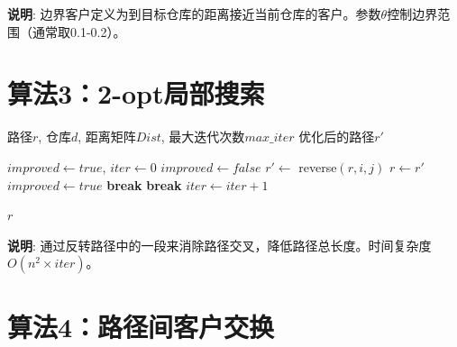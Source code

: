 \documentclass[12pt,a4paper]{article}
\begin{document}
\textbf{说明}: 边界客户定义为到目标仓库的距离接近当前仓库的客户。参数$\theta$控制边界范围（通常取0.1-0.2）。

\newpage

\section{算法3：2-opt局部搜索}

\begin{algorithm}[H]
\caption{2-opt局部搜索（路径内优化）}
\label{alg:2opt}
\begin{algorithmic}[1]
\REQUIRE 路径$r$, 仓库$d$, 距离矩阵$Dist$, 最大迭代次数$max\_iter$
\ENSURE 优化后的路径$r'$

\STATE $improved \gets true$, $iter \gets 0$
    \STATE $improved \gets false$
            \STATE $r' \gets$ reverse$(r, i, j)$  
                \STATE $r \gets r'$
                \STATE $improved \gets true$
                \STATE \textbf{break}
            \ENDIF
        \ENDFOR
            \STATE \textbf{break}
        \ENDIF
    \ENDFOR
    \STATE $iter \gets iter + 1$
\ENDWHILE

\RETURN $r$
\end{algorithmic}
\end{algorithm}

\textbf{说明}: 通过反转路径中的一段来消除路径交叉，降低路径总长度。时间复杂度$O(n^2 \times iter)$。

\newpage

\section{算法4：路径间客户交换}
\end{document}
